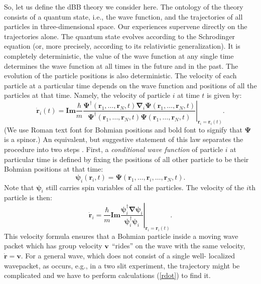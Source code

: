 \documentclass[preprint,tightenlines]{elsarticle}
\begin{document}
So, let us define the dBB theory we consider here. The ontology of
the theory consists of a quantum state, i.e., the wave function, and
the trajectories of all particles in three-dimensional space. Our
experiences supervene directly on the trajectories alone. The quantum
state evolves according to the Schrodinger equation (or, more precisely,
according to its relativistic generalization). It is completely deterministic,
the value of the wave function at any single time determines the wave
function at all times in the future and in the past. The evolution
of the particle positions is also deterministic. The velocity of each
particle at a particular time depends on the wave function and positions
of all the particles at that time. Namely, the velocity of particle
$i$ at time $t$ is given by:
 \begin{equation}
\dot{\boldsymbol{\textbf{r}}}_{i}(t)=
\textbf{Im}\frac{\hbar}{m}\left.\frac{\mathbf{\boldsymbol{\Psi}}^{\dagger}\left(\boldsymbol{r}_{1},\ldots,\boldsymbol{r}_{N},t\right)
\boldsymbol{\nabla}_{i}\boldsymbol{\Psi}\left(\boldsymbol{r}_{1},\ldots,\boldsymbol{r}_{N},t\right)}{\boldsymbol{\Psi}^{\dagger}
\left(\boldsymbol{r}_{1},\ldots,\boldsymbol{r}_{N},t\right)\boldsymbol{\Psi}\left(\boldsymbol{r}_{1},\ldots,\boldsymbol{r}_{N},t\right)}\right|_{\boldsymbol{r}_{i}=
\boldsymbol{\textbf{r}}_{i}(t)}.\label{eq:Bvel_preview}
\end{equation}
(We use Roman text font for Bohmian positions and bold font to signify
that $\mathbf{\boldsymbol{\Psi}}$ is a spinor.) An equivalent, but
suggestive statement of this law separates the procedure into two
steps \cite{Goldstein}. First, a \textit{conditional wave function}
of particle $i$ at particular time is defined by fixing the positions
of all other particle to be their Bohmian positions at that time:
\begin{equation}
\boldsymbol{\psi}_{i}(\boldsymbol{r}_{i},t)=
\boldsymbol{\Psi}\left(\boldsymbol{\textbf{r}}_{1},\ldots,\boldsymbol{r}_{i},\ldots,\boldsymbol{\textbf{r}}_{N},t\right).\label{psief}
\end{equation}
 Note that $\boldsymbol{\psi}_{i}$ still carries spin variables of
all the particles. The velocity of the $i$th particle is then:
\begin{equation}
\dot{\boldsymbol{\textbf{r}}}_{i}=
\frac{\hbar}{m}\textbf{Im}\left.\frac{\boldsymbol{\psi}_{i}^{\dagger}\boldsymbol{\nabla}\boldsymbol{\psi}_{i}}
{\boldsymbol{\psi}_{i}^{\dagger}\boldsymbol{\psi}_{i}}\right|_{\boldsymbol{r}_{i}=\boldsymbol{\textbf{r}}_{i}(t)}\label{rdot}.
\end{equation}
 This velocity formula ensures that a Bohmian particle inside a moving
wave packet which has group velocity $\bf{v}$ ``rides'' on the
wave with the same velocity, $\dot{\mathbf{r}}=\mathbf{v}$. For a
general wave, which does not consist of a single well- localized wavepacket,
as occurs, e.g., in a two slit experiment, the trajectory might be
complicated and we have to perform calculations (\ref{rdot}) to find
it.
\end{document}
